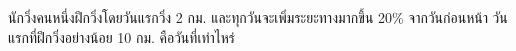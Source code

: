 ﻿%
\question นักวิ่งคนหนึ่งฝึกวิ่งโดยวันแรกวิ่ง 2 กม. และทุกวันจะเพิ่มระยะทางมากขึ้น 20\% จากวันก่อนหน้า วันแรกที่ฝึกวิ่งอย่างน้อย 10 กม. คือวันที่เท่าไหร่
\newline
{}
